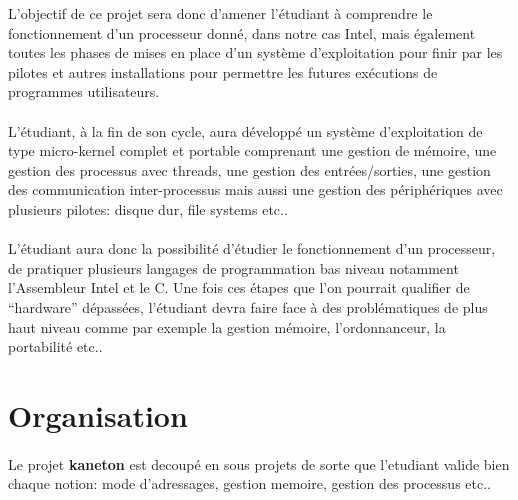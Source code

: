 \documentclass[10pt,a4wide]{article}
\begin{document}
L'objectif de ce projet sera donc d'amener l'\'etudiant \`a comprendre le
fonctionnement d'un processeur donn\'e, dans notre cas Intel, mais \'egalement
toutes les phases de mises en place d'un syst\`eme d'exploitation pour finir
par les pilotes et autres installations pour permettre les futures ex\'ecutions
de programmes utilisateurs.

\paragraph{}

L'\'etudiant, \`a la fin de son cycle, aura d\'evelopp\'e un syst\`eme
d'exploitation de type micro-kernel complet et portable comprenant une
gestion de m\'emoire, une gestion des processus avec threads, une gestion
des entr\'ees/sorties, une gestion des communication inter-processus
mais aussi une gestion des p\'eriph\'eriques avec plusieurs pilotes:
disque dur, file systems etc..

\paragraph{}

L'\'etudiant aura donc la possibilit\'e d'\'etudier le fonctionnement d'un
processeur, de pratiquer plusieurs langages de programmation bas niveau
notamment l'Assembleur Intel et le C. Une fois ces \'etapes que l'on pourrait
qualifier de ``hardware'' d\'epass\'ees, l'\'etudiant devra faire face
\`a des probl\'ematiques de plus haut niveau comme par exemple la gestion
m\'emoire, l'ordonnanceur, la portabilit\'e etc..

\newpage

\section{Organisation}

\paragraph{}

Le projet \textbf{kaneton} est decoup\'e en sous projets de sorte que
l'etudiant valide bien chaque notion: mode d'adressages, gestion memoire,
gestion des processus etc..

\paragraph{}
\end{document}
